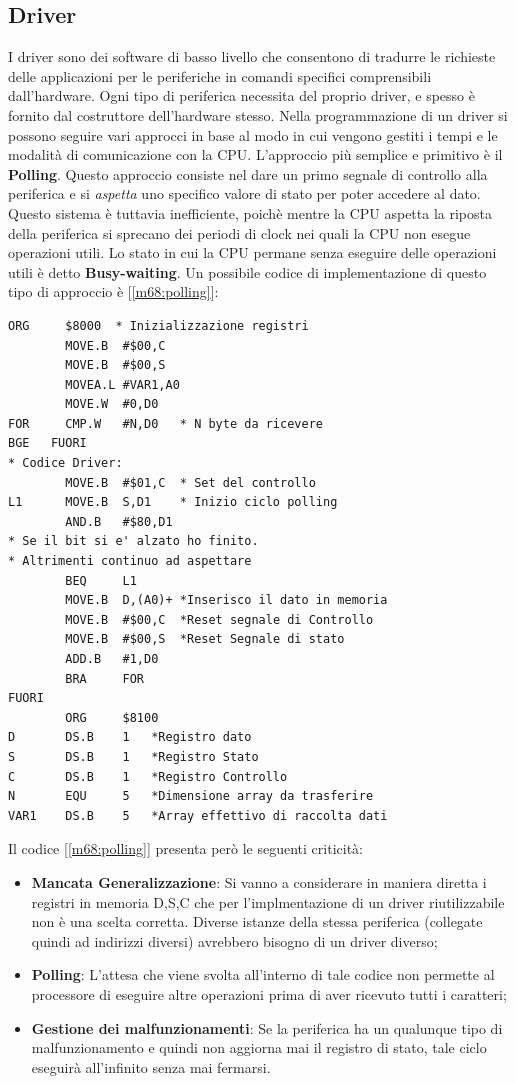 \subsection{Driver}
I driver sono dei software di basso livello che consentono di tradurre le richieste delle applicazioni per le periferiche in comandi specifici comprensibili dall'hardware. Ogni tipo di periferica necessita del proprio driver, e spesso è fornito dal costruttore dell'hardware stesso. 
Nella programmazione di un driver si possono seguire vari approcci in base al modo in cui vengono gestiti i tempi e le modalità di comunicazione con la CPU. L'approccio più semplice e primitivo è il \textbf{Polling}. Questo approccio consiste nel dare un primo segnale di controllo alla periferica e si \textit{aspetta} uno specifico valore di stato per poter accedere al dato. Questo sistema è tuttavia inefficiente, poichè mentre la CPU aspetta la riposta della periferica si sprecano dei periodi di clock nei quali la CPU non esegue operazioni utili. Lo stato in cui la CPU permane senza eseguire delle operazioni utili è detto \textbf{Busy-waiting}. Un possibile codice di implementazione di questo tipo di approccio è [\ref{m68:polling}]:

\begin{lstlisting}[caption={Codice polling}, label=m68:polling]
        ORG     $8000  * Inizializzazione registri
        MOVE.B  #$00,C
        MOVE.B  #$00,S
        MOVEA.L #VAR1,A0
        MOVE.W  #0,D0
FOR     CMP.W   #N,D0   * N byte da ricevere
BGE   FUORI
* Codice Driver:
        MOVE.B  #$01,C  * Set del controllo
L1      MOVE.B  S,D1    * Inizio ciclo polling
        AND.B   #$80,D1  
* Se il bit si e' alzato ho finito. 
* Altrimenti continuo ad aspettare
        BEQ     L1
        MOVE.B  D,(A0)+ *Inserisco il dato in memoria
        MOVE.B  #$00,C  *Reset segnale di Controllo
        MOVE.B  #$00,S  *Reset Segnale di stato 
        ADD.B   #1,D0             
        BRA     FOR
FUORI
        ORG     $8100
D       DS.B    1   *Registro dato
S       DS.B    1   *Registro Stato
C       DS.B    1   *Registro Controllo
N       EQU     5   *Dimensione array da trasferire
VAR1    DS.B    5   *Array effettivo di raccolta dati
\end{lstlisting}
\newpage
Il codice [\ref{m68:polling}] presenta però le seguenti criticità:
\begin{itemize}
    \item \textbf{Mancata Generalizzazione}: Si vanno a considerare in maniera diretta i registri in memoria D,S,C che per l'implmentazione di un driver riutilizzabile non è una scelta corretta. Diverse istanze della stessa periferica (collegate quindi ad indirizzi diversi) avrebbero bisogno di un driver diverso;
    \item \textbf{Polling}: L'attesa che viene svolta all'interno di tale codice non permette al processore di eseguire altre operazioni prima di aver ricevuto tutti i caratteri;
    \item \textbf{Gestione dei malfunzionamenti}: Se la periferica ha un qualunque tipo di malfunzionamento e quindi non aggiorna mai il registro di stato, tale ciclo eseguirà all'infinito senza mai fermarsi.
\end{itemize}

